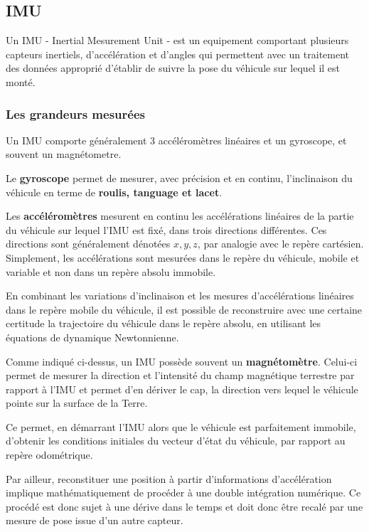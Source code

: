 \documentclass[12pt,a4paper]{report}
\begin{document}
		
		\subsection{IMU}
		Un IMU - Inertial Mesurement Unit - est un equipement comportant plusieurs capteurs inertiels, d'accélération et d'angles qui permettent avec un traitement des données approprié d'établir de suivre la pose du véhicule sur lequel il est monté.
		
		\subsubsection{Les grandeurs mesurées}
		Un IMU comporte généralement 3 accéléromètres linéaires et un gyroscope, et souvent un magnétometre.
		
		\para Le \textbf{gyroscope} permet de mesurer, avec précision et en continu, l'inclinaison du véhicule en terme de \textbf{roulis, tanguage et lacet}. 
		
		\para Les \textbf{accéléromètres} mesurent en continu les accélérations linéaires de la partie du véhicule sur lequel l'IMU est fixé, dans trois directions différentes. Ces directions sont généralement dénotées $x,y,z$, par analogie avec le repère cartésien. Simplement, les accélérations sont mesurées dans le repère du véhicule, mobile et variable et non dans un repère absolu immobile.
		
		\para En combinant les variations d'inclinaison et les mesures d'accélérations linéaires dans le repère mobile du véhicule, il est possible de reconstruire avec une certaine certitude la trajectoire du véhicule dans le repère absolu, en utilisant les équations de dynamique Newtonnienne.
		
		
		\para Comme indiqué ci-dessus, un IMU possède souvent un \textbf{magnétomètre}. Celui-ci permet de mesurer la direction et l'intensité du champ magnétique terrestre par rapport à l'IMU et permet d'en dériver le cap, la direction vers lequel le véhicule pointe sur la surface de la Terre. 
		
		\para Ce permet, en démarrant l'IMU alors que le véhicule est parfaitement immobile, d'obtenir les conditions initiales du vecteur d'état du véhicule, par rapport au repère odométrique.
		
		\para Par ailleur, reconstituer une position à partir d'informations d'accélération implique mathématiquement de procéder à une double intégration numérique. Ce procédé est donc sujet à une dérive dans le temps et doit donc être recalé par une mesure de pose issue d'un autre capteur.
		
\end{document}
